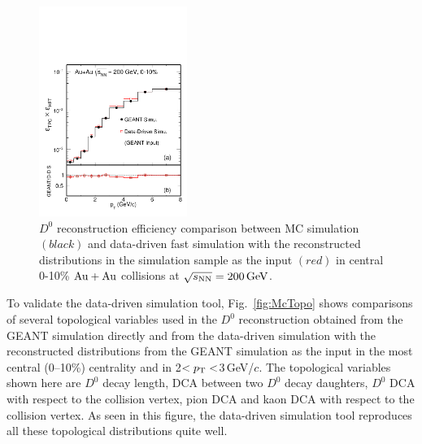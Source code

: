 \documentclass[%
 reprint,	
 amsmath,amssymb,
 aps,
 prc,
]{revtex4-1}
\begin{document}
\begin{figure}
\centering
\includegraphics[width=0.43\textwidth]{fig/Mcd0Eff_0_10.pdf}
\caption{$D^{0}$ reconstruction efficiency comparison between MC simulation $(black)$ and data-driven fast simulation with the reconstructed distributions in the simulation sample as the input $(red)$ in central 0-10\% ${\rm{Au + Au}}$ collisions at ${\sqrt{s_{\rm NN}} = \rm{200\,GeV}}$.}
\label{fig:Mcd0Eff_0_10} 
\end{figure}



To validate the data-driven simulation tool, Fig.~\ref{fig:McTopo} shows comparisons of several topological variables used in the $D^0$ reconstruction obtained from the GEANT simulation directly and from the data-driven simulation with the reconstructed distributions from the GEANT simulation as the input in the most central (0--10\%) centrality and in 2$<p_{\rm T}<$3\,GeV/$c$. The topological variables shown here are $D^0$ decay length, DCA between two $D^0$ decay daughters, $D^0$ DCA with respect to the collision vertex, pion DCA and kaon DCA with respect to the collision vertex. As seen in this figure, the data-driven simulation tool reproduces all these topological distributions quite well.
\end{document}

